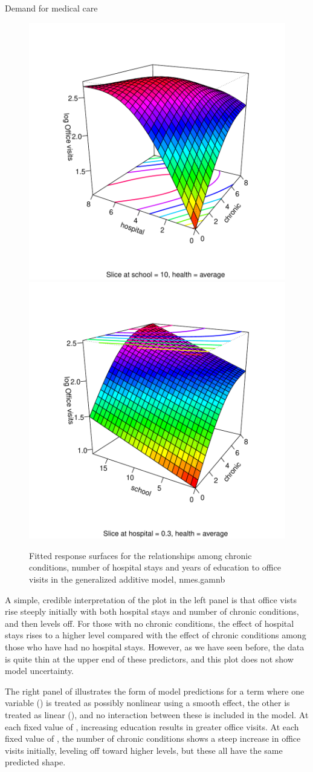 \documentclass[11pt]{book}\usepackage[]{graphicx}\usepackage[]{color}
\newenvironment{knitrout}{}{} %
\renewenvironment{knitrout}{\small\renewcommand{\baselinestretch}{.85}}{} %
\begin{document}
\begin{Example}[nmes3]{Demand for medical care}
\begin{knitrout}
\begin{figure}[!htbp]
\centerline{\includegraphics[width=.5\textwidth]{ch09/fig/nmes3-rsm1} 
\includegraphics[width=.5\textwidth]{ch09/fig/nmes3-rsm2} }

\caption[Fitted response surfaces for the relationships among chronic conditions,  number of hospital stays and years of education to office visits in the generalized additive model, nmes]{Fitted response surfaces for the relationships among chronic conditions,  number of hospital stays and years of education to office visits in the generalized additive model, nmes.gamnb\label{fig:nmes3-rsm}}
\end{figure}


\end{knitrout}
A simple, credible interpretation of the plot in the left panel is
that office vists rise steeply initially with both hospital stays and number of chronic conditions, and then
levels off. For those with no chronic conditions, the effect of hospital stays rises to a higher level
compared with the effect of chronic conditions among those who have had no hospital stays.
However, as we have seen before, the data is quite thin at the upper end of these
predictors, and this plot does not show model uncertainty.

The right panel of  illustrates the form of model predictions for a term
where one variable () is treated as possibly nonlinear using a smooth 
effect, the other is treated as linear (), and no interaction between these is
included in the model.  At each fixed value of , increasing education results in
greater office visits.  At each fixed value of , the number of chronic conditions shows
a steep increase in office visits initially, leveling off toward higher levels, but these all have
the same predicted shape.


\end{Example}
\end{document}
